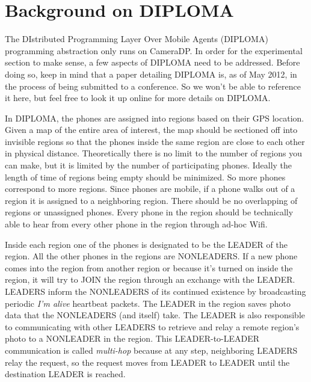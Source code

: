 \chapter{Background on DIPLOMA}

The DIstributed Programming Layer Over Mobile Agents (DIPLOMA) programming abstraction only runs on CameraDP. In order for the experimental section to make sense, a few aspects of DIPLOMA need to be addressed. Before doing so, keep in mind that a paper detailing DIPLOMA is, as of May 2012, in the process of being submitted to a conference. So we won't be able to reference it here, but feel free to look it up online for more details on DIPLOMA.

In DIPLOMA, the phones are assigned into regions based on their GPS location. Given a map of the entire area of interest, the map should be sectioned off into invisible regions so that the phones inside the same region are close to each other in physical distance. Theoretically there is no limit to the number of regions you can make, but it is limited by the number of participating phones. Ideally the length of time of regions being empty should be minimized. So more phones correspond to more regions. Since phones are mobile, if a phone walks out of a region it is assigned to a neighboring region. There should be no overlapping of regions or unassigned phones. Every phone in the region should be technically able to hear from every other phone in the region through ad-hoc Wifi. 

Inside each region one of the phones is designated to be the LEADER of the region. All the other phones in the regions are NONLEADERS. If a new phone comes into the region from another region or because it's turned on inside the region, it will try to JOIN the region through an exchange with the LEADER. LEADERS inform the NONLEADERS of its continued existence by broadcasting periodic {\it I'm alive} heartbeat packets. The LEADER in the region saves photo data that the NONLEADERS (and itself) take. The LEADER is also responsible to communicating with other LEADERS to retrieve and relay a remote region's photo to a NONLEADER in the region. This LEADER-to-LEADER communication is called {\it multi-hop} because at any step, neighboring LEADERS relay the request, so the request moves from LEADER to LEADER until the destination LEADER is reached.

